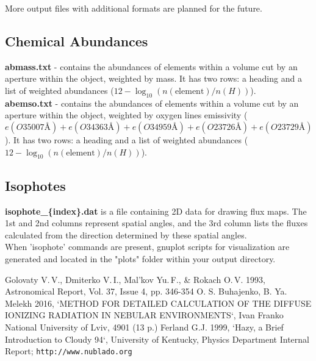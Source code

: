\documentclass[a4paper]{article}
\begin{document}
More output files with additional formats are planned for the future.

\subsection{Chemical Abundances}
{\bf abmass.txt} - contains the abundances of elements within a volume cut by an aperture within the object, weighted by mass.
It has two rows: a heading and a list of weighted abundances ($12 - \log_{10}(n(\text{element})/n(H))$). \\
{\bf abemso.txt} - contains the abundances of elements within a volume cut by an aperture within the object, weighted by oxygen
lines emissivity ($e(O3  5007\text{\AA}) + e(O3  4363\text{\AA}) + e(O3  4959\text{\AA}) + e(O2  3726\text{\AA}) + e(O2  3729\text{\AA})$).
It has two rows: a heading and a list of weighted abundances ($12 - \log_{10}(n(\text{element})/n(H))$).

\subsection{Isophotes}

{\bf isophote\_\{index\}.dat} is a file containing 2D data for drawing flux maps.
The 1st and 2nd columns represent spatial angles, and the 3rd column lists the fluxes calculated from the direction determined by these spatial angles. \\

When 'isophote' commands are present, gnuplot scripts for visualization are generated and located in the "plots"
folder within your output directory.


\begin{thebibliography}{3}
{\small
{} Golovaty V.\,V., Dmiterko V.\,I., Mal'kov Yu.\,F., \& Rokach O.\,V. 1993, Astronomical Report, Vol. 37, Issue 4, pp. 346-354
 O. S. Buhajenko, B. Ya. Melekh 2016, `METHOD FOR DETAILED CALCULATION OF THE DIFFUSE IONIZING RADIATION IN NEBULAR ENVIRONMENTS`, Ivan Franko National University of Lviv, 4901 (13 p.) 
 Ferland G.J. 1999, `Hazy, a Brief Introduction to Cloudy 94`, University of Kentucky, Physics Department Internal Report; \texttt{http://www.nublado.org}
}
\end{thebibliography}
\end{document}
